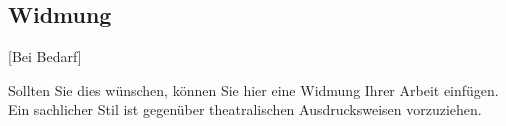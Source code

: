 \documentclass[Bachelorarbeit.tex]{subfiles}
\begin{document}
\begin{envLanguage}[ngerman]
%
\chapter*{Widmung}
[Bei Bedarf]\par
%
Sollten Sie dies wünschen, können Sie hier eine Widmung Ihrer Arbeit einfügen. Ein sachlicher Stil ist gegenüber theatralischen Ausdrucksweisen vorzuziehen.
%
\end{envLanguage}
\end{document}
